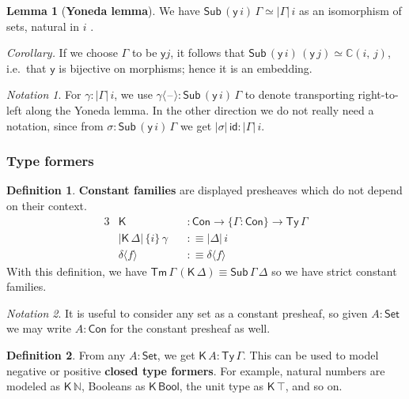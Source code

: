 \documentclass[12pt,a4paper,twoside,openany]{book}
\theoremstyle{remark}
\newtheorem{notation}{Notation}
\theoremstyle{definition}
\newtheorem{mydefinition}{Definition}
\newtheorem{mylemma}{Lemma}
\theoremstyle{theorem}
\newcommand{\ms}[1]{\mathsf{#1}}
\newcommand{\mbb}[1]{\mathbb{#1}}
\newcommand{\id}{\mathsf{id}}
\newcommand{\Con}{\mathsf{Con}}
\newcommand{\Sub}{\mathsf{Sub}}
\newcommand{\Tm}{\mathsf{Tm}}
\newcommand{\Ty}{\mathsf{Ty}}
\newcommand{\blank}{\mathord{\hspace{1pt}\text{--}\hspace{1pt}}}
\newcommand{\Set}{\mathsf{Set}}
\newcommand{\K}{\mathsf{K}}
\newcommand{\Bool}{\ms{Bool}}
\newcommand{\mbbC}{\mbb{C}}
\newcommand{\lab}{\langle}
\newcommand{\rab}{\rangle}
\newcommand{\defn}{:\equiv}
\newcommand{\yon}{\ms{y}}
\begin{document}
\begin{mylemma}[\textbf{Yoneda lemma}] We have $\Sub\,(\yon\,i)\,\Gamma \simeq |\Gamma|\,i$ as an isomorphism of sets, natural in $i$ \cite[Section~III.2]{maclane98categories}.
\end{mylemma}

\noindent\emph{Corollary.} If we choose $\Gamma$ to be $\yon j$, it follows that
$\Sub\,(\yon\,i)\,(\yon\,j) \simeq \mbbC(i,\,j)$, i.e.\ that $\yon$ is
bijective on morphisms; hence it is an embedding.

\begin{notation}
\label{not:yoneda}
For $\gamma : |\Gamma|\,i$, we use $\gamma\lab \blank \rab :
\Sub\,(\yon\,i)\,\Gamma $ to denote transporting right-to-left along the Yoneda
lemma. In the other direction we do not really need a notation, since from
$\sigma : \Sub\,(\yon\,i)\,\Gamma$ we get $|\sigma|\,\id : |\Gamma|\,i$.
\end{notation}

\subsubsection{Type formers}

\begin{mydefinition}
\label{def:k-psh}
\textbf{Constant families} are displayed presheaves which do not depend on their context.
\begin{alignat*}{3}
  & \K &&: \Con \to \{\Gamma : \Con \} \to \Ty\,\Gamma\\
  & |\K\,\Delta|\,\{i\}\,\gamma\,&&\defn |\Delta|\,i \\
  & \delta\lab f \rab &&\defn \delta \lab f \rab
\end{alignat*}
With this definition, we have $\Tm\,\Gamma\,(\K\,\Delta) \equiv \Sub\,\Gamma\,\Delta$
so we have strict constant families.
\end{mydefinition}

\begin{notation}
It is useful to consider any set as a constant presheaf, so
given $A : \Set$ we may write $A : \Con$ for the constant presheaf
as well.
\end{notation}

\begin{mydefinition}
From any $A : \Set$, we get $\K\,A : \Ty\,\Gamma$. This can be used to
model negative or positive \textbf{closed type formers}. For example, natural
numbers are modeled as $\K\,\mbb{N}$, Booleans as $\K\,\Bool$, the unit type as
$\K\,\top$, and so on.
\end{mydefinition}
\end{document}
